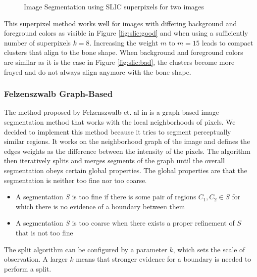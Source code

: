 \documentclass[pdftex,12pt,a4paper]{report}
\begin{document}
\begin{figure}[h]
\begin{subfigure}[b]{0.24\textwidth}
		\subcaption*{}
		\label{}
	\end{subfigure}
	\caption{Image Segmentation using SLIC superpixels for two images}
	\label{fig:slic}
\end{figure}

This superpixel method works well for images with differing background and foreground colors as visible in Figure \ref{fig:slic:good} and when using a sufficiently number of superpixels $k=8$. Increasing the weight $m$ to $m=15$ leads to compact clusters that align to the bone shape. When background and foreground colors are similar as it is the case in Figure \ref{fig:slic:bad}, the clusters become more frayed and do not always align anymore with the bone shape.

\subsubsection{Felzenszwalb Graph-Based}

The method proposed by Felzenszwalb et. al in \cite{felzenszwalb2004efficient} is a graph based image segmentation method that works with the local neighborhoods of pixels. We decided to implement this method because it tries to segment perceptually similar regions. It works on the neighborhood graph of the image and defines the edges weights as the difference between the intensity of the pixels. The algorithm then iteratively splits and merges segments of the graph until the overall segmentation obeys certain global properties. The global properties are that the segmentation is neither too fine nor too coarse.

\begin{itemize}
	\item A segmentation $S$ is too fine if there is some pair of regions $C_1, C_2 \in S$ for which there is no evidence of a boundary between them
	\item A segmentation $S$ is too coarse when there exists a proper refinement of $S$ that is not too fine
\end{itemize}

The split algorithm can be configured by a parameter $k$, which sets the scale of observation. A larger $k$ means that stronger evidence for a boundary is needed to perform a split.
\end{document}
